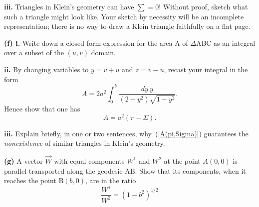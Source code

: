 \documentclass[a4paper]{article} %
\begin{document}
\begin{framed}
\textbf{iii.} Triangles in Klein’s geometry can have $\sum=0$! Without proof, sketch what such a triangle might look like. Your sketch by necessity will be an incomplete representation; there is no way to draw a Klein triangle faithfully on a flat page.
\end{framed}

\begin{framed}
\textbf{(f) i.} Write down a closed form expression for the area A of $\Delta$ABC as an integral over a subset of the $(u,v)$ domain.
\end{framed}

\begin{framed}
\textbf{ii.} By changing variables to $y=v+u$ and $z=v-u$, recast your integral in the form
\begin{equation}
A=2a^2\int^b_0 \frac{dy~y}{(2-y^2)\sqrt{1-y^2}}.
\end{equation}
Hence show that one has
\begin{equation}
A=a^2(\pi-\Sigma).\label{A(pi,Sigma)}
\end{equation}
\end{framed}

\begin{framed}
\textbf{iii.} Explain briefly, in one or two sentences, why~(\ref{A(pi,Sigma)}) guarantees the \emph{nonexistence} of similar triangles in Klein’s geometry.
\end{framed}

\begin{framed}
\textbf{(g)} A vector $\vec{W}$ with equal components $W^1$ and $W^2$ at the point $A(0,0)$ is parallel transported along the geodesic AB. Show that its components, when it reaches the point B$(b,0)$, are in the ratio
\begin{equation}
\frac{W^1}{W^2}=(1-b^2)^{1/2}
\end{equation}
\end{framed}
\end{document}
